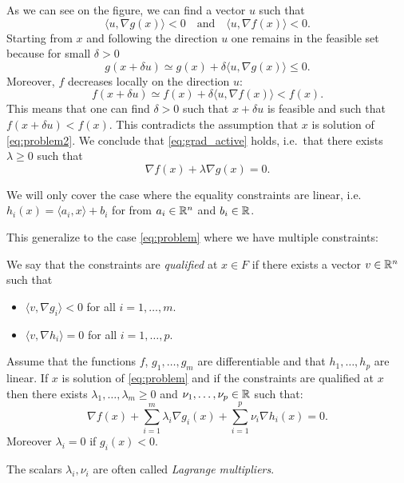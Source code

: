 \documentclass[11pt,nocut]{article}
\begin{document}
As we can see on the figure, we can find a vector $u$ such that
$$
\langle u, \nabla g(x) \rangle < 0 
\quad \text{and} \quad
\langle u, \nabla f(x) \rangle < 0.
$$
Starting from $x$ and following the direction $u$ one remains in the feasible set because for small $\delta >0$
$$
g(x + \delta u) \simeq g(x) + \delta \langle u, \nabla g(x) \rangle \leq 0.
$$
Moreover, $f$ decreases locally on the direction $u$:
$$
f(x + \delta u) \simeq f(x) + \delta \langle u, \nabla f(x) \rangle < f(x).
$$
This means that one can find $\delta > 0$ such that $x + \delta u$ is feasible and such that $f(x + \delta u) < f(x)$. This contradicts the assumption that $x$ is solution of \eqref{eq:problem2}.
We conclude that \eqref{eq:grad_active} holds, i.e.\ that there exists $\lambda \geq 0$ such that
$$
\nabla f(x) + \lambda \nabla g(x) = 0.
$$

We will only cover the case where the equality constraints are linear, i.e. $h_i(x) = \langle a_i, x \rangle + b_i$ for from $a_i \in \mathbb{R}^n$ and $b_i \in \mathbb{R}$.

This generalize to the case \eqref{eq:problem} where we have multiple constraints:

\begin{definition}
	We say that the constraints are \emph{qualified} at $x \in F$ if there exists a vector $v \in \mathbb{R}^n$ such that
	\begin{itemize}
		\item $\langle v, \nabla g_i \rangle < 0$ for all $i=1,\dots, m$.
		\item $\langle v, \nabla h_i \rangle = 0$ for all $i=1, \dots, p$.
	\end{itemize}
\end{definition}

\begin{theorem}
	Assume that the functions $f$, $g_1, \dots, g_m$ are differentiable and that $h_1, \dots, h_p$ are linear. If $x$ is solution of \eqref{eq:problem} and if the constraints are qualified at $x$
	then there exists $\lambda_1, \dots, \lambda_m \geq 0$ and $\nu_1, \dots, \nu_p \in \mathbb{R}$ such that:
	\begin{equation}\label{eq:kkt}
		\nabla f(x) + \sum_{i=1}^m \lambda_i \nabla g_i(x) + \sum_{i=1}^p \nu_i \nabla h_i(x) = 0.
	\end{equation}
	Moreover $\lambda_i = 0$ if $g_i(x) < 0$.
\end{theorem}

The scalars $\lambda_i, \nu_i$ are often called \emph{Lagrange multipliers}.
\end{document}
